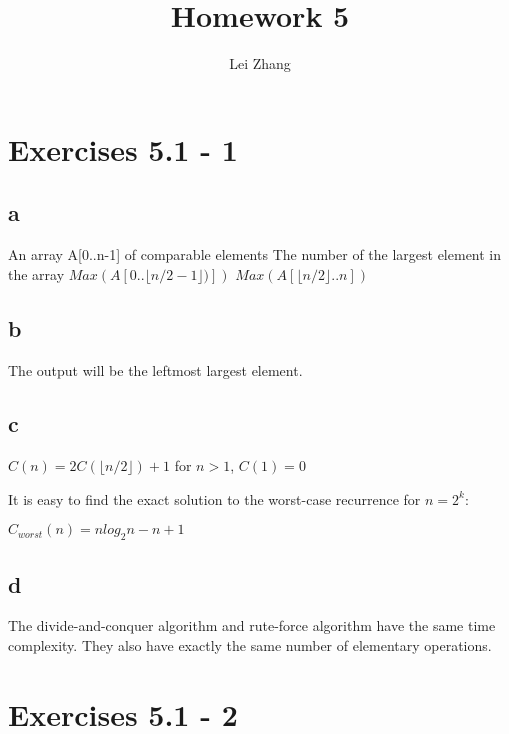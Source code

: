 \documentclass{article}
\title{Homework 5}
\author{Lei Zhang}
\begin{document}
\maketitle

\section{Exercises 5.1 - 1}

\subsection*{a}

\begin{center}
\begin{algorithmic}
\INPUT
An array A[0..n-1] of comparable elements
\OUTPUT
The number of the largest element in the array
\State {}
\State \Return $Max(A[0..\lfloor n/2-1 \rfloor)])$
\Else
\State \Return $Max(A[\lfloor n/2 \rfloor..n])$
\EndIf
\EndFunction
\end{algorithmic}
\end{center}

\subsection*{b}

The output will be the leftmost largest element.

\subsection*{c}

$C(n) = 2C(\lfloor n/2 \rfloor) + 1$ for $ n > 1$, $C(1) = 0$

It is easy to find the exact solution to the worst-case recurrence for $n = 2^k$:

$C_{worst}(n) = nlog_2n-n+1$

\subsection*{d}

The divide-and-conquer algorithm and rute-force algorithm have the same time complexity. They also have exactly the same number of elementary operations.


\section{Exercises 5.1 - 2}
\end{document}
